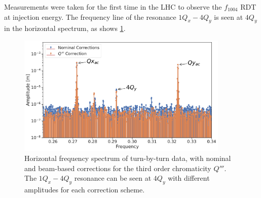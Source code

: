 Measurements were taken for the first time in the LHC to observe the $f_{1004}$ RDT
at injection energy. The frequency line of the resonance $1Q_x - 4Q_y$ is seen at $4Q_y$ in the
horizontal spectrum, as shows \cref{fig:decapoles:rdts:spectrum_f1004}.

\begin{figure}[!htb]
    \centering
    \includegraphics[width=0.9\textwidth]{./images/f1004x_spectrum.pdf}
    \caption{Horizontal frequency spectrum of turn-by-turn data, with nominal and beam-based
    corrections for the third order chromaticity $Q'''$. The $1Q_x - 4Q_y$ resonance can be seen
    at $4Q_y$ with different amplitudes for each correction scheme.}
    \label{fig:decapoles:rdts:spectrum_f1004}
\end{figure}

%


\subsection{}
\label{section:decapoles:decapolar_contribution_correction}

